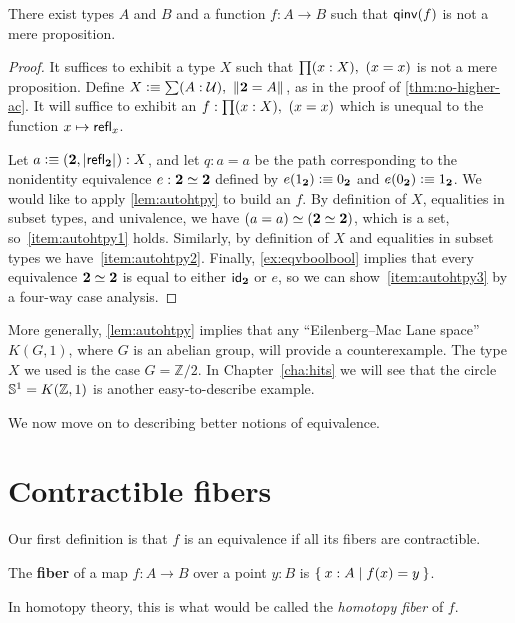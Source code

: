 \begin{thm}
  There exist types $A$ and $B$ and a function $f:A\to B$ such that $\qinv(f)$ is not a mere proposition.
\end{thm}
\begin{proof}
  It suffices to exhibit a type $X$ such that $\prd{x:X} (x=x)$ is not a mere proposition.
  Define $X\defeq \sm{A:\type} \brck{\bool=A}$, as in the proof of \autoref{thm:no-higher-ac}.
  It will suffice to exhibit an $f:\prd{x:X} (x=x)$ which is unequal to the function $x\mapsto \refl{x}$.

  Let $a \defeq (\bool,\bproj{\refl{\bool}}) : X$, and let $q:a=a$ be the path corresponding to the nonidentity equivalence $e:\eqv\bool\bool$ defined by $e(\btrue)\defeq\bfalse$ and $e(\bfalse)\defeq\btrue$.
  We would like to apply \autoref{lem:autohtpy} to build an $f$.
  By definition of $X$, equalities in subset types, and univalence, we have $\eqv{(a=a)}{(\eqv{\bool}{\bool})}$, which is a set, so~\ref{item:autohtpy1} holds.
  Similarly, by definition of $X$ and equalities in subset types we have~\ref{item:autohtpy2}.
  Finally, \autoref{ex:eqvboolbool} implies that every equivalence $\eqv\bool\bool$ is equal to either $\idfunc[\bool]$ or $e$, so we can show~\ref{item:autohtpy3} by a four-way case analysis.
\end{proof}

More generally, \autoref{lem:autohtpy} implies that any ``Eilenberg--Mac Lane space'' $K(G,1)$, where $G$ is an abelian group, will provide a counterexample.
The type $X$ we used is the case $G = \mathbb{Z}/2$.
In Chapter~\ref{cha:hits} we will see that the circle $\Sn^1 = K(\mathbb{Z},1)$ is another easy-to-describe example.

We now move on to describing better notions of equivalence.


\section{Contractible fibers}
\label{sec:contrf}

Our first definition is that $f$ is an equivalence if all its fibers are contractible.

\begin{defn}
  The \textbf{fiber} of a map $f:A\to B$ over a point $y:B$ is $\setof{x:A | f(x) = y}$.
\end{defn}

In homotopy theory, this is what would be called the \emph{homotopy fiber} of $f$.

